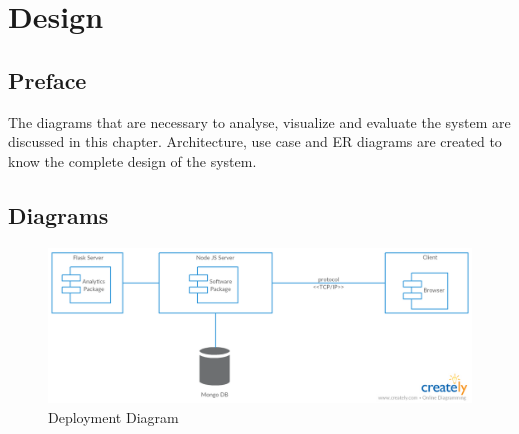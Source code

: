 \documentclass[a4paper,12pt]{report}
\begin{document}
    \chapter {Design}
    \section{Preface}
    The diagrams that are necessary to analyse, visualize and evaluate the system are discussed in this chapter. Architecture, use case and ER diagrams are created to know the complete design of the system.
    \section{Diagrams}          
      
      \begin{figure}[h]
        \includegraphics[width=1\textwidth]{Deployment.png}
        \caption{ Deployment Diagram}  
      \end{figure}
    
\end{document}
